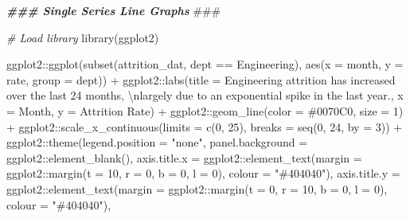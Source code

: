 \documentclass[
]{book}
\newenvironment{Shaded}{\begin{snugshade}}{\end{snugshade}}
\newcommand{\AlertTok}[1]{\textcolor[rgb]{0.94,0.16,0.16}{#1}}
\newcommand{\AttributeTok}[1]{\textcolor[rgb]{0.77,0.63,0.00}{#1}}
\newcommand{\CommentTok}[1]{\textcolor[rgb]{0.56,0.35,0.01}{\textit{#1}}}
\newcommand{\DecValTok}[1]{\textcolor[rgb]{0.00,0.00,0.81}{#1}}
\newcommand{\DocumentationTok}[1]{\textcolor[rgb]{0.56,0.35,0.01}{\textbf{\textit{#1}}}}
\newcommand{\FunctionTok}[1]{\textcolor[rgb]{0.00,0.00,0.00}{#1}}
\newcommand{\NormalTok}[1]{#1}
\newcommand{\SpecialCharTok}[1]{\textcolor[rgb]{0.00,0.00,0.00}{#1}}
\newcommand{\StringTok}[1]{\textcolor[rgb]{0.31,0.60,0.02}{#1}}
\begin{document}
\begin{Shaded}
\begin{Highlighting}[]
\DocumentationTok{\#\#\# Single Series Line Graphs }\AlertTok{\#\#\#}

\CommentTok{\# Load library}
\FunctionTok{library}\NormalTok{(ggplot2)}

\NormalTok{ggplot2}\SpecialCharTok{::}\FunctionTok{ggplot}\NormalTok{(}\FunctionTok{subset}\NormalTok{(attrition\_dat, dept }\SpecialCharTok{==} \StringTok{\textquotesingle{}Engineering\textquotesingle{}}\NormalTok{), }\FunctionTok{aes}\NormalTok{(}\AttributeTok{x =}\NormalTok{ month, }\AttributeTok{y =}\NormalTok{ rate, }\AttributeTok{group =}\NormalTok{ dept)) }\SpecialCharTok{+} 
\NormalTok{ggplot2}\SpecialCharTok{::}\FunctionTok{labs}\NormalTok{(}\AttributeTok{title =} \StringTok{\textquotesingle{}Engineering attrition has increased over the last 24 months, }\SpecialCharTok{\textbackslash{}n}\StringTok{largely due to an exponential spike in the last year.\textquotesingle{}}\NormalTok{, }\AttributeTok{x =} \StringTok{\textquotesingle{}Month\textquotesingle{}}\NormalTok{, }\AttributeTok{y =} \StringTok{\textquotesingle{}Attrition Rate\textquotesingle{}}\NormalTok{) }\SpecialCharTok{+}
\NormalTok{ggplot2}\SpecialCharTok{::}\FunctionTok{geom\_line}\NormalTok{(}\AttributeTok{color =} \StringTok{\textquotesingle{}\#0070C0\textquotesingle{}}\NormalTok{, }\AttributeTok{size =} \DecValTok{1}\NormalTok{) }\SpecialCharTok{+}
\NormalTok{ggplot2}\SpecialCharTok{::}\FunctionTok{scale\_x\_continuous}\NormalTok{(}\AttributeTok{limits =} \FunctionTok{c}\NormalTok{(}\DecValTok{0}\NormalTok{, }\DecValTok{25}\NormalTok{), }\AttributeTok{breaks =} \FunctionTok{seq}\NormalTok{(}\DecValTok{0}\NormalTok{, }\DecValTok{24}\NormalTok{, }\AttributeTok{by =} \DecValTok{3}\NormalTok{)) }\SpecialCharTok{+}
\NormalTok{ggplot2}\SpecialCharTok{::}\FunctionTok{theme}\NormalTok{(}\AttributeTok{legend.position =} \StringTok{"none"}\NormalTok{,}
               \AttributeTok{panel.background =}\NormalTok{ ggplot2}\SpecialCharTok{::}\FunctionTok{element\_blank}\NormalTok{(),}
               \AttributeTok{axis.title.x =}\NormalTok{ ggplot2}\SpecialCharTok{::}\FunctionTok{element\_text}\NormalTok{(}\AttributeTok{margin =}\NormalTok{ ggplot2}\SpecialCharTok{::}\FunctionTok{margin}\NormalTok{(}\AttributeTok{t =} \DecValTok{10}\NormalTok{, }\AttributeTok{r =} \DecValTok{0}\NormalTok{, }\AttributeTok{b =} \DecValTok{0}\NormalTok{, }\AttributeTok{l =} \DecValTok{0}\NormalTok{), }\AttributeTok{colour =} \StringTok{"\#404040"}\NormalTok{),}
               \AttributeTok{axis.title.y =}\NormalTok{ ggplot2}\SpecialCharTok{::}\FunctionTok{element\_text}\NormalTok{(}\AttributeTok{margin =}\NormalTok{ ggplot2}\SpecialCharTok{::}\FunctionTok{margin}\NormalTok{(}\AttributeTok{t =} \DecValTok{0}\NormalTok{, }\AttributeTok{r =} \DecValTok{10}\NormalTok{, }\AttributeTok{b =} \DecValTok{0}\NormalTok{, }\AttributeTok{l =} \DecValTok{0}\NormalTok{), }\AttributeTok{colour =} \StringTok{"\#404040"}\NormalTok{),}

\end{Highlighting}
\end{Shaded}
\end{document}
